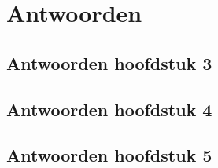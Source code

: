 \documentclass[a4paper, 12pt, extrafontsizes]{memoir}
\begin{document}
\graphicspath{{images/}}
\frontmatter%
\pagestyle{empty}

\cleardoublepage
\pagestyle{empty}
\tableofcontents*
\mainmatter%
\pagestyle{mypagestyle}





\begin{appendices}

\end{appendices}
\chapter*{Antwoorden}\label{chap:antwoorden}
\pagestyle{empty}
\clearpage

\section*{Antwoorden hoofdstuk 3}
\graphicspath{{chapter03/images/}}
\printsolutions[headings=false, chapter=3]
\clearpage
\section*{Antwoorden hoofdstuk 4}
\graphicspath{{chapter04/images/}}
\printsolutions[headings=false, chapter=4]
\clearpage
\section*{Antwoorden hoofdstuk 5}
\graphicspath{{chapter05/images/}}
\printsolutions[headings=false, chapter=5]
\backmatter%
\end{document}
